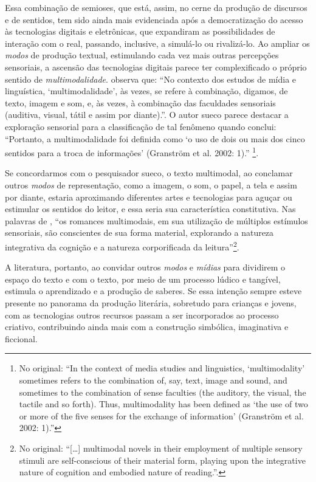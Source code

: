 \documentclass[portuguese]{textolivre}
\begin{document}
Essa combinação de semioses, que está, assim, no cerne da produção de discursos
e de sentidos, tem sido ainda mais evidenciada após a democratização do acesso
às tecnologias digitais e eletrônicas, que expandiram as possibilidades de
interação com o real, passando, inclusive, a simulá-lo ou rivalizá-lo. Ao
ampliar os \textit{modos} de produção textual, estimulando cada vez mais outras
percepções sensoriais, a ascensão das tecnologias digitais parece ter
complexificado o próprio sentido de \textit{multimodalidade}.
\textcite{ellestrom_modalities_2021} observa que: “No contexto dos estudos de
mídia e linguística, ‘multimodalidade’, às vezes, se refere à combinação,
digamos, de texto, imagem e som, e, às vezes, à combinação das faculdades
sensoriais (auditiva, visual, tátil e assim por diante).”. O autor sueco parece
destacar a exploração sensorial para a classificação de tal fenômeno quando
conclui: “Portanto, a multimodalidade foi definida como ‘o uso de dois ou mais
dos cinco sentidos para a troca de informações’ (Granström et al. 2002: 1).”
\cite[p.~41, tradução nossa]{ellestrom_modalities_2021}\footnote{
    No original:
    “In the context of media studies and linguistics, ‘multimodality’ sometimes
    refers to the combination of, say, text, image and sound, and sometimes to the
    combination of sense faculties (the auditory, the visual, the tactile and so
    forth). Thus, multimodality has been defined as ‘the use of two or more of the
    five senses for the exchange of information’ (Granström et al. 2002: 1).”}.

Se concordarmos com o pesquisador sueco, o texto multimodal, ao conclamar
outros \textit{modos} de representação, como a imagem, o som, o papel, a tela e
assim por diante, estaria aproximando diferentes artes e tecnologias para
aguçar ou estimular os sentidos do leitor, e essa seria sua característica
constitutiva. Nas palavras de \textcite[p.~100]{gibbons_i_2010}, “os romances
multimodais, em sua utilização de múltiplos estímulos sensoriais, são
conscientes de sua forma material, explorando a natureza integrativa da
cognição e a natureza corporificada da leitura”\footnote{No original: “[…]
multimodal novels in their employment of multiple sensory stimuli are
self-conscious of their material form, playing upon the integrative nature of
cognition and embodied nature of reading.”.}.

A literatura, portanto, ao convidar outros \textit{modos} e \textit{mídias}
para dividirem o espaço do texto e com o texto, por meio de um processo lúdico
e tangível, estimula o aprendizado e a produção de saberes. Se essa intenção
sempre esteve presente no panorama da produção literária, sobretudo para
crianças e jovens, com as tecnologias outros recursos passam a ser incorporados
ao processo criativo, contribuindo ainda mais com a construção simbólica,
imaginativa e ficcional.
\end{document}
